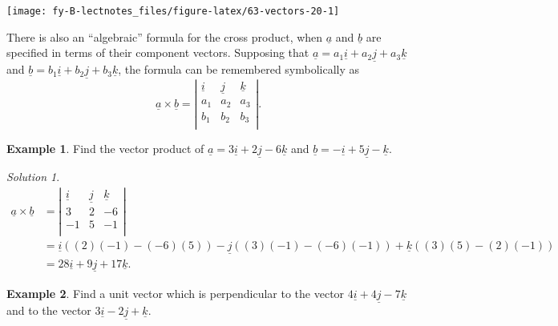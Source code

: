 \documentclass[
  english,
  11pt,
  oneside]{book}
\newcommand{\slide}{}
\theoremstyle{definition}
\theoremstyle{definition}
\newtheorem{example}{Example}[chapter]
\theoremstyle{definition}
\theoremstyle{definition}
\theoremstyle{remark}
\newtheorem*{solution}{Solution}
\begin{document}
\begin{center}\texttt{[image: fy-B-lectnotes\_files/figure-latex/63-vectors-20-1]} \end{center}

\slide

There is also an ``algebraic'' formula for the cross product, when
\(\underline a\) and \(\underline b\) are specified in terms of their component vectors. Supposing that \(\underline a = a_1\underline i + a_2\underline j + a_3\underline k\) and \(\underline b = b_1\underline i + b_2\underline j + b_3\underline k\), the formula can be remembered symbolically as
\[
\underline a \times\underline b = \left|\begin{array}{ccc}\underline i&\underline j&\underline k\\a_1&a_2&a_3\\b_1&b_2&b_3\\\end{array}\right|.
\]
\slide

\begin{example}
Find the vector product of \(\underline a=3\underline i+2\underline j-6\underline k\) and \(\underline b=-\underline i + 5\underline j-\underline k\).
\end{example}

\begin{solution}
\begin{align*}
\underline a \times\underline b& = \left|\begin{array}{ccc}\underline i&\underline j&\underline k\\3&2&-6\\-1&5&-1\\\end{array}\right|\\
&= \underline i((2)(-1)-(-6)(5))-\underline j((3)(-1)-(-6)(-1))+\underline k((3)(5)-(2)(-1))\\
&=28\underline i+9\underline j+17\underline k.
\end{align*}
\end{solution}

\slide

\begin{example}
Find a unit vector which is perpendicular to the vector \(4\underline i+4\underline j-7\underline k\) and to the vector \(3\underline i - 2\underline j+\underline k\).
\end{example}
\end{document}
